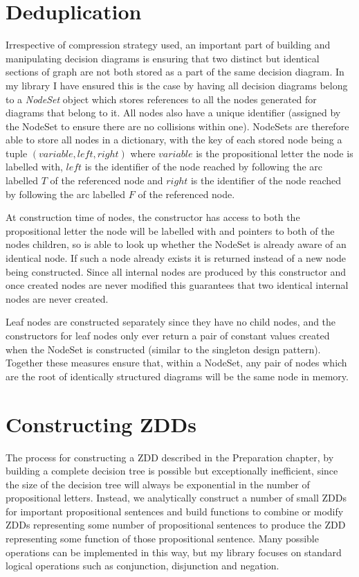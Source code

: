\documentclass[12pt,a4paper,twoside,openright]{report}
\begin{document}
\section{Deduplication}
Irrespective of compression strategy used, an important part of building and manipulating decision diagrams is ensuring that two distinct but identical sections of graph are not both stored as a part of the same decision diagram. In my library I have ensured this is the case by having all decision diagrams belong to a \textit{NodeSet} object which stores references to all the nodes generated for diagrams that belong to it. All nodes also have a unique identifier (assigned by the NodeSet to ensure there are no collisions within one). NodeSets are therefore able to store all nodes in a dictionary, with the key of each stored node being a tuple $(\mathit{variable}, \mathit{left}, \mathit{right})$ where $\mathit{variable}$ is the propositional letter the node is labelled with, $\mathit{left}$ is the identifier of the node reached by following the arc labelled $T$ of the referenced node and $\mathit{right}$ is the identifier of the node reached by following the arc labelled $F$ of the referenced node.

At construction time of nodes, the constructor has access to both the propositional letter the node will be labelled with and pointers to both of the nodes children, so is able to look up whether the NodeSet is already aware of an identical node. If such a node already exists it is returned instead of a new node being constructed. Since all internal nodes are produced by this constructor and once created nodes are never modified this guarantees that two identical internal nodes are never created.

Leaf nodes are constructed separately since they have no child nodes, and the constructors for leaf nodes only ever return a pair of constant values created when the NodeSet is constructed (similar to the singleton design pattern). Together these measures ensure that, within a NodeSet, any pair of nodes which are the root of identically structured diagrams will be the same node in memory.

\section{Constructing ZDDs}
The process for constructing a ZDD described in the Preparation chapter, by building a complete decision tree is possible but exceptionally inefficient, since the size of the decision tree will always be exponential in the number of propositional letters. Instead, we analytically construct a number of small ZDDs for important propositional sentences and build functions to combine or modify ZDDs representing some number of propositional sentences to produce the ZDD representing some function of those propositional sentence. Many possible operations can be implemented in this way, but my library focuses on standard logical operations such as conjunction, disjunction and negation.
\end{document}
